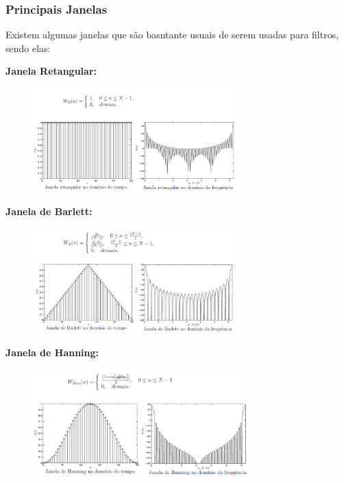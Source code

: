 \documentclass{article}
\begin{document}
\subsubsection{Principais Janelas}
Existem algumas janelas que são basntante usuais de serem usadas para filtros, sendo elas:

\textbf{Janela Retangular:}
\begin{figure}[h!]
    \centering
    \includegraphics[width=0.7\textwidth]{imgs/janela_ret.png}
\end{figure}

\newpage
\textbf{Janela de Barlett:}
\begin{figure}[h!]
    \centering
    \includegraphics[width=0.7\textwidth]{imgs/janela_barlett.png}
\end{figure}

\textbf{Janela de Hanning:}
\begin{figure}[h!]
    \centering
    \includegraphics[width=0.75\textwidth]{imgs/janela_hanning.png}
\end{figure}
\end{document}
